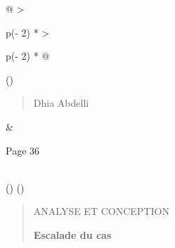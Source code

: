 \documentclass[
]{article}
\begin{document}
\begin{longtable}[]{@{}
  >{\raggedright\arraybackslash}p{(\columnwidth - 2\tabcolsep) * }
  >{\raggedright\arraybackslash}p{(\columnwidth - 2\tabcolsep) * }@{}}
\toprule()
\begin{minipage}[b]{\linewidth}\raggedright
\begin{quote}
Dhia Abdelli
\end{quote}
\end{minipage} & \begin{minipage}[b]{\linewidth}\raggedright
Page 36
\end{minipage} \\
\midrule()
\endhead
\bottomrule()
\end{longtable}

\begin{quote}
ANALYSE ET CONCEPTION

\textbf{Escalade du cas}
\end{quote}
\end{document}
